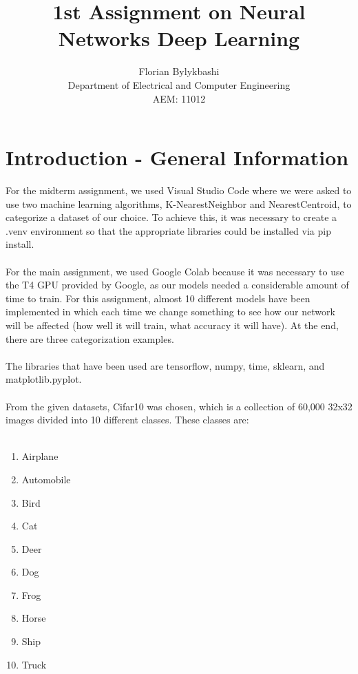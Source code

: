 \documentclass[11pt, letterpaper]{article}
\begin{document}
\begin{titlepage}
\title{\textbf{\Huge 1st Assignment on Neural Networks Deep Learning} \vspace{7 cm}}

\author{\LARGE Florian Bylykbashi \\ \LARGE Department of Electrical and Computer Engineering \\ \LARGE AEM: 11012 \vspace{4 cm}}
\maketitle
\thispagestyle{empty}
\end{titlepage}


\section*{Introduction - General Information}
For the midterm assignment, we used Visual Studio Code where we were asked to use two machine learning algorithms, K-NearestNeighbor and NearestCentroid, to categorize a dataset of our choice. To achieve this, it was necessary to create a .venv environment so that the appropriate libraries could be installed via pip install. \\ \\
For the main assignment, we used Google Colab because it was necessary to use the T4 GPU provided by Google, as our models needed a considerable amount of time to train. For this assignment, almost 10 different models have been implemented in which each time we change something to see how our network will be affected (how well it will train, what accuracy it will have). At the end, there are three categorization examples.\\ \\
The libraries that have been used are tensorflow, numpy, time, sklearn, and matplotlib.pyplot. \\ \\
From the given datasets, Cifar10 was chosen, which is a collection of 60,000 32x32 images divided into 10 different classes. These classes are: \\ \\
\begin{enumerate}
    \item Airplane
    \item Automobile
    \item Bird
    \item Cat
    \item Deer
    \item Dog
    \item Frog
    \item Horse
    \item Ship
    \item Truck \\ \\
\end{enumerate} 
\end{document}
